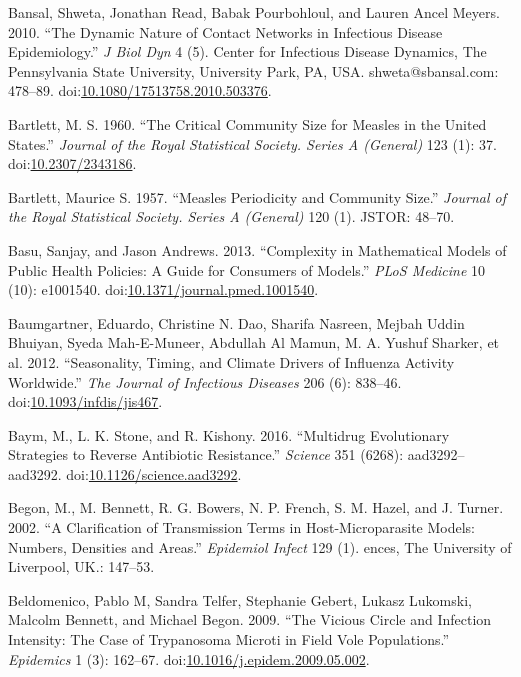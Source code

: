 \documentclass[]{article}
\theoremstyle{definition}
\theoremstyle{definition}
\theoremstyle{definition}
\theoremstyle{remark}
\begin{document}
\hypertarget{ref-bansal10}{}
Bansal, Shweta, Jonathan Read, Babak Pourbohloul, and Lauren Ancel
Meyers. 2010. ``The Dynamic Nature of Contact Networks in Infectious
Disease Epidemiology.'' \emph{J Biol Dyn} 4 (5). Center for Infectious
Disease Dynamics, The Pennsylvania State University, University Park,
PA, USA. shweta@sbansal.com: 478--89.
doi:\href{https://doi.org/10.1080/17513758.2010.503376}{10.1080/17513758.2010.503376}.

\hypertarget{ref-bartlett60}{}
Bartlett, M. S. 1960. ``The Critical Community Size for Measles in the
United States.'' \emph{Journal of the Royal Statistical Society. Series
A (General)} 123 (1): 37.
doi:\href{https://doi.org/10.2307/2343186}{10.2307/2343186}.

\hypertarget{ref-bartlett57}{}
Bartlett, Maurice S. 1957. ``Measles Periodicity and Community Size.''
\emph{Journal of the Royal Statistical Society. Series A (General)} 120
(1). JSTOR: 48--70.

\hypertarget{ref-basu13}{}
Basu, Sanjay, and Jason Andrews. 2013. ``Complexity in Mathematical
Models of Public Health Policies: A Guide for Consumers of Models.''
\emph{PLoS Medicine} 10 (10): e1001540.
doi:\href{https://doi.org/10.1371/journal.pmed.1001540}{10.1371/journal.pmed.1001540}.

\hypertarget{ref-baumgartner12}{}
Baumgartner, Eduardo, Christine N. Dao, Sharifa Nasreen, Mejbah Uddin
Bhuiyan, Syeda Mah-E-Muneer, Abdullah Al Mamun, M. A. Yushuf Sharker, et
al. 2012. ``Seasonality, Timing, and Climate Drivers of Influenza
Activity Worldwide.'' \emph{The Journal of Infectious Diseases} 206 (6):
838--46.
doi:\href{https://doi.org/10.1093/infdis/jis467}{10.1093/infdis/jis467}.

\hypertarget{ref-baym16}{}
Baym, M., L. K. Stone, and R. Kishony. 2016. ``Multidrug Evolutionary
Strategies to Reverse Antibiotic Resistance.'' \emph{Science} 351
(6268): aad3292--aad3292.
doi:\href{https://doi.org/10.1126/science.aad3292}{10.1126/science.aad3292}.

\hypertarget{ref-begon02}{}
Begon, M., M. Bennett, R. G. Bowers, N. P. French, S. M. Hazel, and J.
Turner. 2002. ``A Clarification of Transmission Terms in
Host-Microparasite Models: Numbers, Densities and Areas.''
\emph{Epidemiol Infect} 129 (1). ences, The University of Liverpool,
UK.: 147--53.

\hypertarget{ref-beldomenico09}{}
Beldomenico, Pablo M, Sandra Telfer, Stephanie Gebert, Lukasz Lukomski,
Malcolm Bennett, and Michael Begon. 2009. ``The Vicious Circle and
Infection Intensity: The Case of Trypanosoma Microti in Field Vole
Populations.'' \emph{Epidemics} 1 (3): 162--67.
doi:\href{https://doi.org/10.1016/j.epidem.2009.05.002}{10.1016/j.epidem.2009.05.002}.
\end{document}
